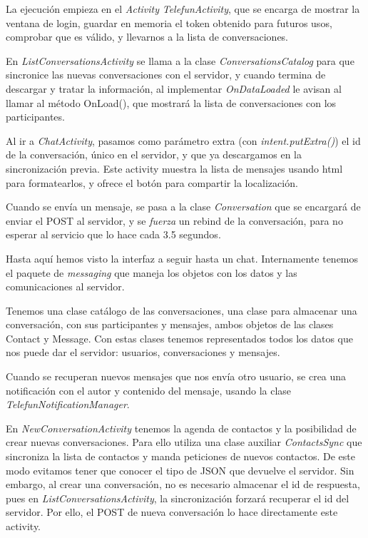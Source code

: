 \documentclass[]{article}
\begin{document}
\hfill

\hfill

La ejecución empieza en el \textit{Activity} \textit{TelefunActivity}, que se encarga de mostrar la ventana de login, guardar en memoria el token obtenido para futuros usos, comprobar que es válido, y llevarnos a la lista de conversaciones.

\hfill


En \textit{ListConversationsActivity} se llama a la clase \textit{ConversationsCatalog} para que sincronice las nuevas conversaciones con el servidor, y cuando termina de descargar y tratar la información, al implementar \textit{OnDataLoaded} le avisan al llamar al método OnLoad(), que mostrará la lista de conversaciones con los participantes.

\hfill

Al ir a \textit{ChatActivity}, pasamos como parámetro extra (con \textit{intent.putExtra()}) el id de la conversación, único en el servidor, y que ya descargamos en la sincronización previa. Este activity muestra la lista de mensajes usando html para formatearlos, y ofrece el botón para compartir la localización.

Cuando se envía un mensaje, se pasa a la clase \textit{Conversation} que se encargará de enviar el POST al servidor, y se \textit{fuerza} un rebind de la conversación, para no esperar al servicio que lo hace cada 3.5 segundos.

\hfill

Hasta aquí hemos visto la interfaz a seguir hasta un chat. Internamente tenemos el paquete de \textit{messaging} que maneja los objetos con los datos y las comunicaciones al servidor.

Tenemos una clase catálogo de las conversaciones, una clase para almacenar una conversación, con sus participantes y mensajes, ambos objetos de las clases Contact y Message. Con estas clases tenemos representados todos los datos que nos puede dar el servidor: usuarios, conversaciones y mensajes.

Cuando se recuperan nuevos mensajes que nos envía otro usuario, se crea una notificación con el autor y contenido del mensaje, usando la clase \textit{TelefunNotificationManager}.

\hfill

En \textit{NewConversationActivity} tenemos la agenda de contactos y la posibilidad de crear nuevas conversaciones. Para ello utiliza una clase auxiliar \textit{ContactsSync} que sincroniza la lista de contactos y manda peticiones de nuevos contactos. De este modo evitamos tener que conocer el tipo de JSON que devuelve el servidor. Sin embargo, al crear una conversación, no es necesario almacenar el id de respuesta, pues en \textit{ListConversationsActivity}, la sincronización forzará recuperar el id del servidor. Por ello, el POST de nueva conversación lo hace directamente este activity.
\end{document}
